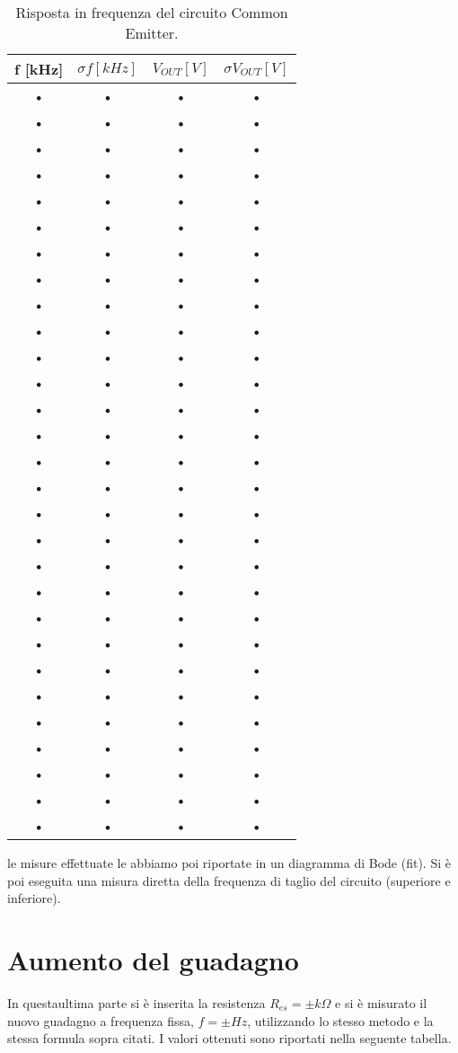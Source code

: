 \documentclass[10pt,a4paper]{article}
\begin{document}
\begin{table}[h]
\centering
\begin{tabular}{|c|c|c|c|}
\hline 
f [kHz] & $\sigma f [kHz]$ & $V_{OUT} [V]$ & $\sigma V_{OUT} [V]$ \\ 
\hline 
• & • & • & • \\ 
\hline 
• & • & • & • \\ 
\hline 
• & • & • & • \\ 
\hline 
• & • & • & • \\ 
\hline 
• & • & • & • \\ 
\hline 
• & • & • & • \\ 
\hline 
• & • & • & • \\ 
\hline 
• & • & • & • \\ 
\hline 
• & • & • & • \\ 
\hline 
• & • & • & • \\ 
\hline 
• & • & • & • \\ 
\hline 
• & • & • & • \\ 
\hline 
• & • & • & • \\ 
\hline 
• & • & • & • \\ 
\hline 
• & • & • & • \\ 
\hline 
• & • & • & • \\ 
\hline 
• & • & • & • \\ 
\hline 
• & • & • & • \\ 
\hline 
• & • & • & • \\ 
\hline 
• & • & • & • \\ 
\hline 
• & • & • & • \\ 
\hline 
• & • & • & • \\ 
\hline 
• & • & • & • \\ 
\hline 
• & • & • & • \\ 
\hline 
• & • & • & • \\ 
\hline 
• & • & • & • \\ 
\hline 
• & • & • & • \\ 
\hline 
• & • & • & • \\ 
\hline 
• & • & • & • \\ 
\hline 
\end{tabular} 
\caption{Risposta in frequenza del circuito Common Emitter.}
\end{table}
le misure effettuate le abbiamo poi riportate in un diagramma di Bode (fit).
Si è poi eseguita una misura diretta della frequenza di taglio del circuito (superiore e inferiore).

\section{Aumento del guadagno}
In questaultima parte si è inserita la resistenza $R_{es}= \pm k\Omega$ e si è misurato il nuovo guadagno a frequenza fissa, $f= \pm Hz$, utilizzando lo stesso metodo e la stessa formula sopra citati. I valori ottenuti sono riportati nella seguente tabella.
\end{document}
